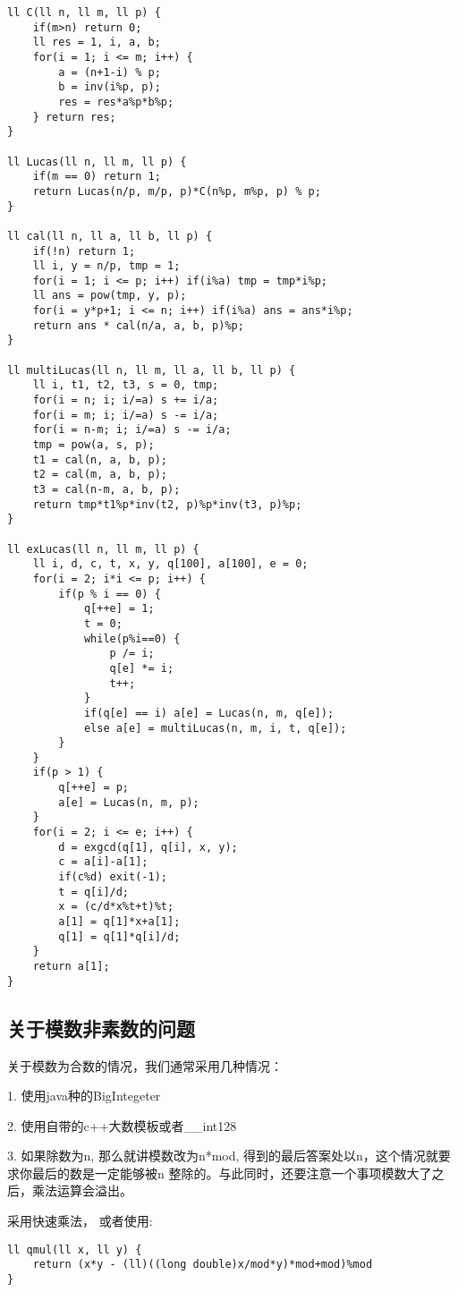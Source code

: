 \begin{lstlisting}
ll C(ll n, ll m, ll p) {
    if(m>n) return 0;
    ll res = 1, i, a, b;
    for(i = 1; i <= m; i++) {
        a = (n+1-i) % p;
        b = inv(i%p, p);
        res = res*a%p*b%p;
    } return res;
}

ll Lucas(ll n, ll m, ll p) {
    if(m == 0) return 1;
    return Lucas(n/p, m/p, p)*C(n%p, m%p, p) % p;
}

ll cal(ll n, ll a, ll b, ll p) {
    if(!n) return 1;
    ll i, y = n/p, tmp = 1;
    for(i = 1; i <= p; i++) if(i%a) tmp = tmp*i%p;
    ll ans = pow(tmp, y, p);
    for(i = y*p+1; i <= n; i++) if(i%a) ans = ans*i%p;
    return ans * cal(n/a, a, b, p)%p;
}

ll multiLucas(ll n, ll m, ll a, ll b, ll p) {
    ll i, t1, t2, t3, s = 0, tmp;
    for(i = n; i; i/=a) s += i/a;
    for(i = m; i; i/=a) s -= i/a;
    for(i = n-m; i; i/=a) s -= i/a;
    tmp = pow(a, s, p);
    t1 = cal(n, a, b, p);
    t2 = cal(m, a, b, p);
    t3 = cal(n-m, a, b, p);
    return tmp*t1%p*inv(t2, p)%p*inv(t3, p)%p;
}

ll exLucas(ll n, ll m, ll p) {
    ll i, d, c, t, x, y, q[100], a[100], e = 0;
    for(i = 2; i*i <= p; i++) {
        if(p % i == 0) {
            q[++e] = 1;
            t = 0;
            while(p%i==0) {
                p /= i;
                q[e] *= i;
                t++;
            }
            if(q[e] == i) a[e] = Lucas(n, m, q[e]);
            else a[e] = multiLucas(n, m, i, t, q[e]);
        }
    }
    if(p > 1) {
        q[++e] = p;
        a[e] = Lucas(n, m, p);
    }
    for(i = 2; i <= e; i++) {
        d = exgcd(q[1], q[i], x, y);
        c = a[i]-a[1];
        if(c%d) exit(-1);
        t = q[i]/d;
        x = (c/d*x%t+t)%t;
        a[1] = q[1]*x+a[1];
        q[1] = q[1]*q[i]/d;
    }
    return a[1];
}
\end{lstlisting}



\subsection{关于模数非素数的问题}


关于模数为合数的情况，我们通常采用几种情况：

1. 使用java种的BigIntegeter

2. 使用自带的c++大数模板或者\_\_int128

3. 如果除数为n, 那么就讲模数改为n*mod, 得到的最后答案处以n，这个情况就要求你最后的数是一定能够被n 整除的。与此同时，还要注意一个事项模数大了之后，乘法运算会溢出。

采用快速乘法， 或者使用:

\begin{lstlisting}
ll qmul(ll x, ll y) {
    return (x*y - (ll)((long double)x/mod*y)*mod+mod)%mod
}
\end{lstlisting}
